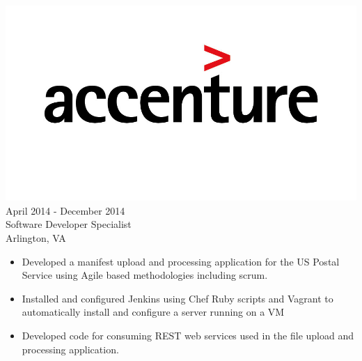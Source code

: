 \documentclass[12pt, line, margin]{res}
\begin{document}
\begin{resume}
	      {\sl  \includegraphics[scale=0.1, trim=110 200 110 120]{resume_images/accenture-logo.jpg}} \hfill April 2014 - December 2014 \\
                Software Developer Specialist \\
                Arlington, VA
                 \begin{itemize}  \itemsep -2pt %
                 \item   Developed a manifest upload and processing application for
			 the US Postal Service using Agile based methodologies including scrum.
                 \item   Installed and configured Jenkins using Chef Ruby scripts
			 and \newline Vagrant to automatically install and configure a server running on a VM
	      \item   Developed code for consuming REST web services used
			 in the file upload and processing application.
   	      \end{itemize}


\end{resume}
\end{document}
